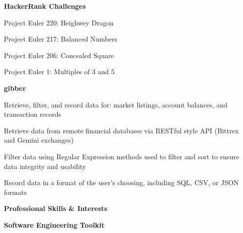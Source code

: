 \documentclass[letterpaper,final]{memoir}
\newcommand{\LargeSep}{\vspace{1.3em}}
\newcommand{\Sep}{\vspace{1.0em}}
\newcommand{\SmallSep}{\vspace{0.4em}}
\newcommand{\CVSection}[1]
	{\LARGE\textbf{#1}\par
	\SmallSep\normalsize}
\newcommand{\CVItem}[1]
	{\textbf{\color{Blue} #1}}
\begin{document}
\CVItem{HackerRank Challenges}
\SmallSep

\begin{multicols}{2}

    \begin{compactitem}[\color{Blue}$\circ$]

        
        \item Project Euler 220:    Heighwey Dragon
        
        \item Project Euler 217:    Balanced Numbers

        \item Project Euler 206:    Concealed Square

        \item Project Euler 1:      Multiples of 3 and 5

       
    \end{compactitem}

\end{multicols}

\Sep
\CVItem{gibber} 

\begin{compactitem}[\color{Blue}$\circ$]

    \SmallSep
    
    \item Retrieve, filter, and record data for: market listings, account balances, and transaction records
    
    \item Retrieve data from remote financial databases via RESTful style API (Bittrex and Gemini exchanges)
    
    \item Filter data using Regular Expression methods used to filter and sort to ensure data integrity and usability
    
    \item Record data in a format of the user's choosing, including SQL, CSV, or JSON formats
    
\end{compactitem}
\LargeSep


\notoserif \CVSection{Professional Skills \& Interests}
\normalfont

\Sep
\CVItem{Software Engineering Toolkit}
\Sep
\end{document}
